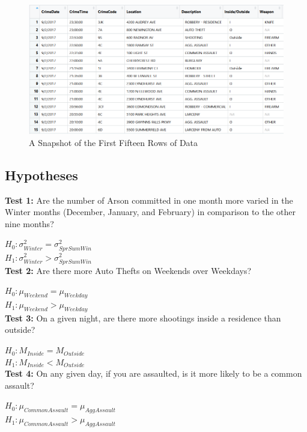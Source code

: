 \documentclass{article}
\newlength\tindent
\renewcommand{\indent}{\hspace*{\tindent}}
\begin{document}
\begin{figure}[h]
\centering
\caption{A Snapshot of the First Fifteen Rows of Data}
\includegraphics[width = 1.0\textwidth]{DataSetView.png}
\end{figure}


\subsection*{Hypotheses}
\indent  \textbf{Test 1:} Are the number of Arson committed in one month more varied in the Winter months (December, January, and February) in comparison to the other nine months?

$H_{0}: \sigma_{Winter}^{2} = \sigma_{SprSumWin}^{2}$ \\
$H_{1}: \sigma_{Winter}^{2} > \sigma_{SprSumWin}^{2}$ \\

\indent \textbf{Test 2:} Are there more Auto Thefts on Weekends over Weekdays?

$H_{0}: \mu_{Weekend} = \mu_{Weekday}$ \\
$H_{1}: \mu_{Weekend} > \mu_{Weekday}$ \\

\indent \textbf{Test 3:} On a given night, are there more shootings inside a residence than outside?  

$H_{0}: M_{Inside} = M_{Outside}$ \\
$H_{1}: M_{Inside} < M_{Outside}$ \\

\indent \textbf{Test 4:} On any given day, if you are assaulted, is it more likely to be a common assault?  

$H_{0}: \mu_{CommonAssault} = \mu_{AggAssault}$ \\
$H_{1}: \mu_{CommonAssault} > \mu_{AggAssault}$ \\
\end{document}
